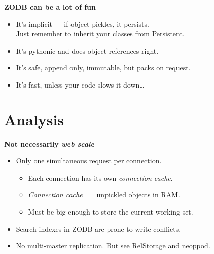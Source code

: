 \documentclass[aspectratio=169]{beamer}
\begin{document}
\begin{frame}[plain,t]
  \vspace{1.0cm}\par
  \Huge
  \bfseries
  \centering ZODB can be a lot of fun
  \LARGE
  \vspace{1.0cm}\par
  \mdseries
  \begin{itemize}[label=--]
    \item It's implicit --- if object pickles, it persists.\\
    \normalsize
    Just remember to inherit your classes from Persistent.
    \LARGE
    \item It's pythonic and does object references right.
    \item It's safe, append only, immutable, but packs on request.
    \item It's fast, unless your code slows it down\ldots
  \end{itemize}
\end{frame}

\section{Analysis}

\begin{frame}[plain,t]
  \vspace{1.0cm}\par
  \Huge
  \bfseries
  \centering Not necessarily \emph{web scale}
  \LARGE
  \vspace{1.0cm}\par
  \mdseries
  \begin{itemize}[label=--]
    \item Only one simultaneous request per connection.
    \begin{itemize}[label=\textbullet]
    \item Each connection has its own \emph{connection cache}.
    \item \emph{Connection cache} $=$ unpickled objects in RAM.
    \item Must be big enough to store the current working set.
    \end{itemize}
    \item Search indexes in ZODB are prone to write conflicts.
    \item No multi-master replication.
    \small But see
    \href{https://pypi.python.org/pypi/RelStorage}{RelStorage}
    and
    \href{https://pypi.python.org/pypi/neoppod}{neoppod}.
  \end{itemize}
\end{frame}
\end{document}
